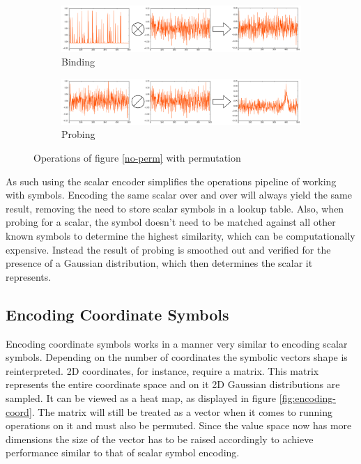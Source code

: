 \documentclass[a4paper,twoside]{article}
\begin{document}
	\begin{figure}
		\begin{subfigure}{1\columnwidth}
			\includegraphics[width=\columnwidth]{img/scalar-post-perm.png}
			\caption{Binding}
			\label{perm-a}
		\end{subfigure}
		\begin{subfigure}{1\columnwidth}
			\includegraphics[width=\columnwidth]{img/scalar-post-perm-probe.png}
			\caption{Probing}
			\label{perm-b}
		\end{subfigure}
		\caption{Operations of figure \ref{no-perm} with permutation}
		\label{perm}
	\end{figure}
	
		As such using the scalar encoder simplifies the operations pipeline of working with symbols. Encoding the same scalar over and over will always yield the same result, removing the need to store scalar symbols in a lookup table. Also, when probing for a scalar, the symbol doesn't need to be matched against all other known symbols to determine the highest similarity, which can be computationally expensive. Instead the result of probing is smoothed out and verified for the presence of a Gaussian distribution, which then determines the scalar it represents. 
		

	\subsection{Encoding Coordinate Symbols}
			
		Encoding coordinate symbols works in a manner very similar to encoding scalar symbols. Depending on the number of coordinates the symbolic vectors shape is reinterpreted. 2D coordinates, for instance, require a matrix. This matrix represents the entire coordinate space and on it 2D Gaussian distributions are sampled. It can be viewed as a heat map, as displayed in figure \ref{fig:encoding-coord}.	The matrix will still be treated as a vector when it comes to running operations on it and must also be permuted. Since the value space now has more dimensions the size of the vector has to be raised accordingly to achieve performance similar to that of scalar symbol encoding. 
		
\end{document}
